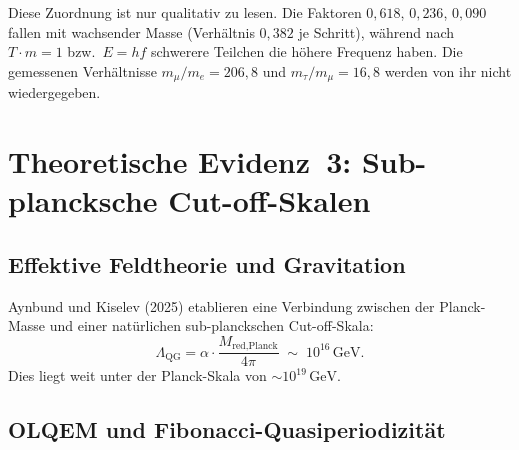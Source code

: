 \begin{table}[H]
\centering
\caption{Leptonen als Harmonische der Grundfrequenz~$f_0$ (qualitative Analogie)}
\smallskip
{}
\end{table}
Diese Zuordnung ist nur qualitativ zu lesen. Die Faktoren $0{,}618$, $0{,}236$, $0{,}090$ fallen mit wachsender Masse (Verhältnis $0{,}382$ je Schritt), während nach $T\cdot m = 1$ bzw.\ $E = hf$ schwerere Teilchen die höhere Frequenz haben. Die gemessenen Verhältnisse $m_\mu/m_e = 206{,}8$ und $m_\tau/m_\mu = 16{,}8$ werden von ihr nicht wiedergegeben.

\section{Theoretische Evidenz~3: Sub-plancksche Cut-off-Skalen}

\subsection{Effektive Feldtheorie und Gravitation}

Aynbund und Kiselev (2025) \cite{Aynbund2025} etablieren eine Verbindung
zwischen der Planck-Masse und einer natürlichen sub-planckschen Cut-off-Skala:
\begin{equation}
  \Lambda_{\text{QG}} = \alpha \cdot \frac{M_{\text{red,Planck}}}{4\pi}
  \;\sim\; 10^{16}\,\text{GeV}.
\end{equation}
Dies liegt weit unter der Planck-Skala von $\sim 10^{19}\,\text{GeV}$.

\subsection{OLQEM und Fibonacci-Quasiperiodizität}

